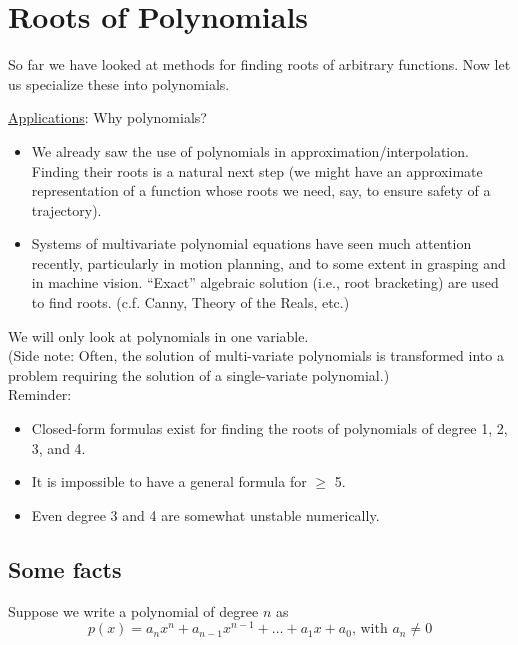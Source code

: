 \chapter{Roots of Polynomials}

So far we have looked at methods for finding roots of arbitrary functions. Now let us specialize these into polynomials. \newline

\noindent \underline{Applications}: Why polynomials?
\begin{itemize}
    \item We already saw the use of polynomials in approximation/interpolation. Finding their roots is a natural next step (we might have an approximate representation of a function whose roots we need, say, to ensure safety of a trajectory).
    \item Systems of multivariate polynomial equations have seen much attention recently, particularly in motion planning, and to some extent in grasping and in machine vision. ``Exact'' algebraic solution (i.e., root bracketing) are used to find roots. (c.f. Canny, Theory of the Reals, etc.)
\end{itemize}


\vspace{1em}

\noindent We will only look at polynomials in one variable. \\
(Side note: Often, the solution of multi-variate polynomials is transformed into a problem requiring the solution of a single-variate polynomial.) \\

\noindent Reminder: 
\begin{itemize}
    \item Closed-form formulas exist for finding the roots of polynomials of degree 1, 2, 3, and 4.
    \item It is impossible to have a general formula for $\geq$ 5.
    \item Even degree 3 and 4 are somewhat unstable numerically.
\end{itemize}

\section{Some facts}

Suppose  we write a polynomial of degree $n$ as
$$p(x) = a_n x^n + a_{n-1} x^{n-1} + \dots + a_1 x + a_0\text{, with }a_n \neq 0$$


